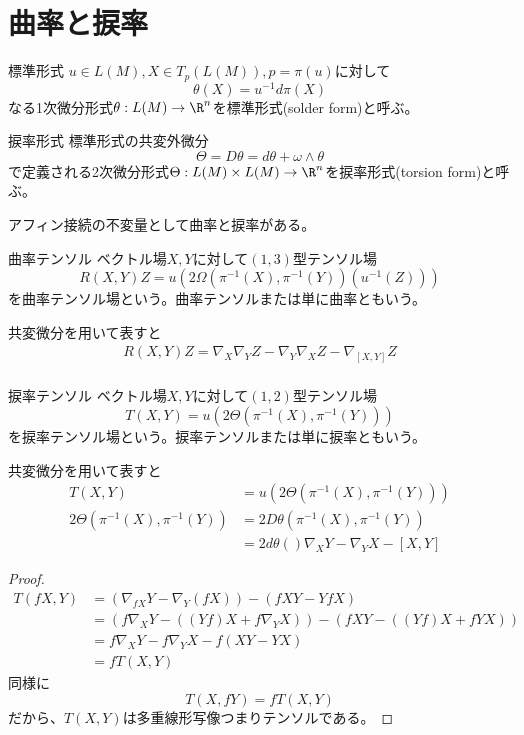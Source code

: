 \section{曲率と捩率}
	\begin{dfn}{標準形式}
		$u \in L(M), X \in T_p(L(M)), p = \pi(u)$に対して
			\[\theta(X) = u^{-1}d\pi(X)\]
		なる1次微分形式$\theta: L(M) \rightarrow \R^n$を標準形式(solder form)と呼ぶ。
	\end{dfn}
	\begin{dfn}{捩率形式}
		標準形式の共変外微分
			\[\Theta = D\theta = d\theta + \omega \wedge \theta\]
		で定義される2次微分形式$\Theta: L(M) \times L(M) \rightarrow \R^n$を捩率形式(torsion form)と呼ぶ。
	\end{dfn}

	アフィン接続の不変量として曲率と捩率がある。
	\begin{dfn}{曲率テンソル}
		ベクトル場$X, Y$に対して$(1, 3)$型テンソル場
			\[R(X, Y)Z = u(2\Omega(\pi^{-1}(X), \pi^{-1}(Y))(u^{-1}(Z)))\]
		を曲率テンソル場という。曲率テンソルまたは単に曲率ともいう。
	\end{dfn}
	共変微分を用いて表すと
	\begin{align*}
		R(X, Y)Z = \nabla_X\nabla_YZ - \nabla_Y\nabla_XZ - \nabla_[X, Y]Z\\
	\end{align*}
	\begin{dfn}{捩率テンソル}
		ベクトル場$X, Y$に対して$(1, 2)$型テンソル場
			\[T(X, Y) = u(2\Theta(\pi^{-1}(X), \pi^{-1}(Y)))\]
		を捩率テンソル場という。捩率テンソルまたは単に捩率ともいう。
	\end{dfn}

	共変微分を用いて表すと
	\begin{align*}
		T(X, Y) &= u(2\Theta(\pi^{-1}(X), \pi^{-1}(Y)))\\
		2\Theta(\pi^{-1}(X), \pi^{-1}(Y))
		&= 2D\theta(\pi^{-1}(X), \pi^{-1}(Y))\\
		&= 2d\theta()
		\nabla_XY - \nabla_YX - [X, Y]
	\end{align*}
	\begin{proof}
		\begin{align*}
			T(fX, Y) &= (\nabla_{fX}Y - \nabla_Y(fX)) - (fXY - YfX)\\
			&= (f\nabla_XY - ((Yf)X + f\nabla_YX)) - (fXY - ((Yf)X + fYX))\\
			&= f\nabla_XY - f\nabla_YX - f(XY - YX)\\
			&= fT(X, Y)
		\end{align*}
		同様に
			\[T(X, fY) = fT(X, Y)\]
		だから、$T(X, Y)$は多重線形写像つまりテンソルである。
	\end{proof}

